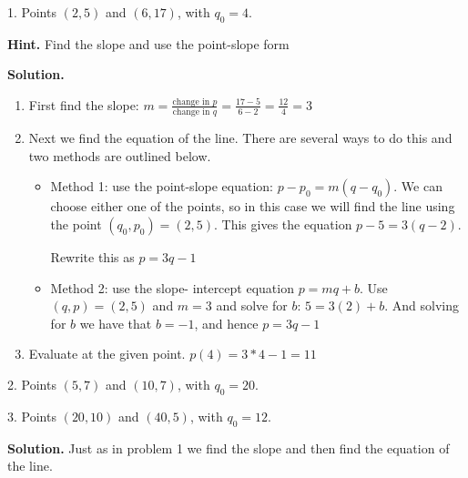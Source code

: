 \documentclass[10pt,]{book}
\theoremstyle{plain}
\theoremstyle{definition}
\begin{document}
\begin{exerciselist}
\item[1.]\hypertarget{exercise-1}{} 
Points \((2,5)\) and \((6,17)\), with \(q_0=4\).
%
\par\smallskip
\par\smallskip
\noindent\textbf{Hint.}\hypertarget{hint-1}{}\quad
Find the slope and use the point-slope form%
\par\smallskip
\noindent\textbf{Solution.}\hypertarget{solution-1}{}\quad
\leavevmode%
\begin{enumerate}[label=(\alph*)]
\item\hypertarget{li-4}{}First find the slope: \(m=  \frac{\text{change in }p}{\text{change in }q}
=  \frac{17-5}{6-2}=\frac{12}{4}=3\)%
\item\hypertarget{li-5}{}Next we find the equation of the line. There are several ways to do this and two methods are outlined below.%
%
\begin{itemize}[label=\textbullet]
\item{}Method 1: use the point-slope equation: \(p-p_0=m (q-q_0)\).
We can choose either one of the points, so in this case we will find the line using the point \((q_0,p_0 )=(2,5)\). This gives the equation
\(p-5=3 (q-2)\).%
\par
Rewrite this as \(p=3q-1\)%
\item{}Method 2: use the slope- intercept equation \(p=m q+b\).
Use \((q,p)=(2,5)\) and \(m = 3\) and solve for \(b\):
\(5=3 (2)+b\).
And solving for \(b\) we have that \(b= -1\), and hence \(p=3q-1\)%
\end{itemize}
\item\hypertarget{li-8}{}Evaluate at the given point.  \(p(4)=3*4-1=11\)%
\end{enumerate}
\item[2.]\hypertarget{exercise-2}{} Points \((5,7)\) and \((10,7)\), with \(q_0=20\).
%
\par\smallskip
\item[3.]\hypertarget{exercise-3}{} Points \((20,10)\) and \((40,5)\), with \(q_0=12\).
%
\par\smallskip
\par\smallskip
\noindent\textbf{Solution.}\hypertarget{solution-2}{}\quad
Just as in problem 1 we find the slope and then find the equation of the line.%
\leavevmode%
\end{exerciselist}
\end{document}
